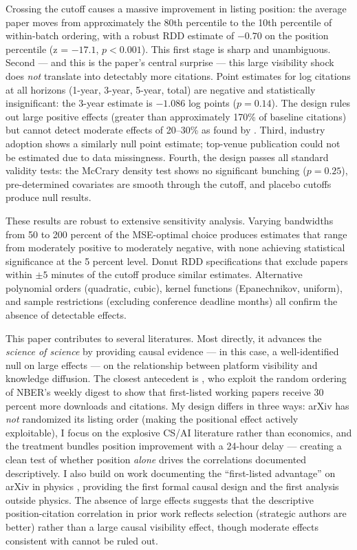 \documentclass[12pt]{article}
\begin{document}
Crossing the cutoff causes a massive improvement in listing position: the average paper moves from approximately the 80th percentile to the 10th percentile of within-batch ordering, with a robust RDD estimate of $-0.70$ on the position percentile (z = $-17.1$, $p < 0.001$). This first stage is sharp and unambiguous. Second --- and this is the paper's central surprise --- this large visibility shock does \textit{not} translate into detectably more citations. Point estimates for log citations at all horizons (1-year, 3-year, 5-year, total) are negative and statistically insignificant: the 3-year estimate is $-1.086$ log points ($p = 0.14$). The design rules out large positive effects (greater than approximately 170\% of baseline citations) but cannot detect moderate effects of 20--30\% as found by \citet{feenberg2017}. Third, industry adoption shows a similarly null point estimate; top-venue publication could not be estimated due to data missingness. Fourth, the design passes all standard validity tests: the McCrary density test shows no significant bunching ($p = 0.25$), pre-determined covariates are smooth through the cutoff, and placebo cutoffs produce null results.

These results are robust to extensive sensitivity analysis. Varying bandwidths from 50 to 200 percent of the MSE-optimal choice produces estimates that range from moderately positive to moderately negative, with none achieving statistical significance at the 5 percent level. Donut RDD specifications that exclude papers within $\pm 5$ minutes of the cutoff produce similar estimates. Alternative polynomial orders (quadratic, cubic), kernel functions (Epanechnikov, uniform), and sample restrictions (excluding conference deadline months) all confirm the absence of detectable effects.

This paper contributes to several literatures. Most directly, it advances the \textit{science of science} \citep{fortunato2018, sinatra2016, wang2013} by providing causal evidence --- in this case, a well-identified null on large effects --- on the relationship between platform visibility and knowledge diffusion. The closest antecedent is \citet{feenberg2017}, who exploit the random ordering of NBER's weekly digest to show that first-listed working papers receive 30 percent more downloads and citations. My design differs in three ways: arXiv has \textit{not} randomized its listing order (making the positional effect actively exploitable), I focus on the explosive CS/AI literature rather than economics, and the treatment bundles position improvement with a 24-hour delay --- creating a clean test of whether position \textit{alone} drives the correlations documented descriptively. I also build on work documenting the ``first-listed advantage'' on arXiv in physics \citep{dietrich2008, haque2009, haque2010}, providing the first formal causal design and the first analysis outside physics. The absence of large effects suggests that the descriptive position-citation correlation in prior work reflects selection (strategic authors are better) rather than a large causal visibility effect, though moderate effects consistent with \citet{feenberg2017} cannot be ruled out.
\end{document}
